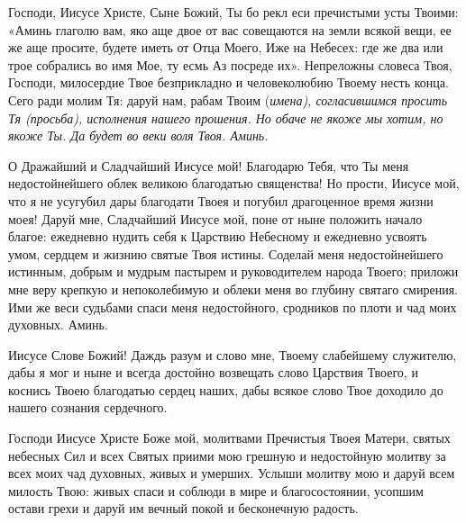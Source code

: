 \mychapterending

 


Господи, Иисусе Христе, Сыне Божий, Ты бо рекл еси пречистыми усты Твоими: «Аминь глаголю вам, яко аще двое от вас совещаются на земли всякой вещи, ее же аще просите, будете иметь от Отца Моего, Иже на Небесех: где же два или трое собрались во имя Мое, ту есмь Аз посреде их». Непреложны словеса Твоя, Господи, милосердие Твое безприкладно и человеколюбию Твоему несть конца. Сего ради молим Тя: даруй нам, рабам Твоим (\itshape имена\normalfont{}), согласившимся просить Тя (\itshape просьба\normalfont{}), исполнения нашего прошения. Но обаче не якоже мы хотим, но якоже Ты. Да будет во веки воля Твоя. Аминь.
\mychapterending

 



О Дражайший и Сладчайший Иисусе мой! Благодарю Тебя, что Ты меня недостойнейшего облек великою благодатью священства! Но прости, Иисусе мой, что я не усугубил дары благодати Твоея и погубил драгоценное время жизни моея! Даруй мне, Сладчайший Иисусе мой, поне от ныне положить начало благое: ежедневно нудить себя к Царствию Небесному и ежедневно усвоять умом, сердцем и жизнию святые Твоя истины. Соделай меня недостойнейшего истинным, добрым и мудрым пастырем и руководителем народа Твоего; приложи мне веру крепкую и непоколебимую и облеки меня во глубину святаго смирения. Ими же веси судьбами спаси меня недостойного, сродников по плоти и чад моих духовных. Аминь.
\mychapterending

 



Иисусе Слове Божий! Даждь разум и слово мне, Твоему слабейшему служителю, дабы я мог и ныне и всегда достойно возвещать слово Царствия Твоего, и коснись Твоею благодатью сердец наших, дабы всякое слово Твое доходило до нашего сознания сердечного.


Господи Иисусе Христе Боже мой, молитвами Пречистыя Твоея Матери, святых небесных Сил и всех Святых приими мою грешную и недостойную молитву за всех моих чад духовных, живых и умерших. Услыши молитву мою и даруй всем милость Твою: живых спаси и соблюди в мире и благосостоянии, усопшим остави грехи и даруй им вечный покой и бесконечную радость.



